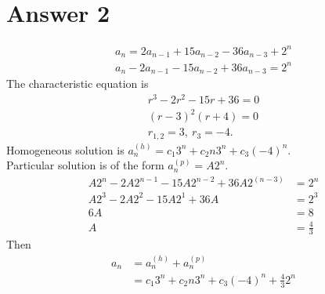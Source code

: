 \documentclass[11pt]{article}
\begin{document}
\section*{Answer 2}
\begin{align*}
    a_n = 2 a_{n-1} + 15 a_{n-2} - 36 a_{n-3} + 2^n \\
    a_n - 2 a_{n-1} - 15 a_{n-2} + 36 a_{n-3} = 2^n
\end{align*}
The characteristic equation is
\begin{align*}
    r^3 - 2r^2 - 15r + 36 = 0 \\
    (r - 3)^2 (r + 4) = 0 \\
    r_{1,2} = 3, \ r_3 = -4.
\end{align*}
Homogeneous solution is $a_n^{(h)} = c_1 3^n + c_2 n 3^n + c_3 (-4)^n$. \\
Particular solution is of the form $a_n^{(p)} = A 2^n$.
\begin{align*}
    A 2^n - 2 A 2^{n - 1} - 15 A 2^{n - 2} + 36 A 2^{(n - 3)} &= 2^n \\
    A 2^3 - 2 A 2^2 - 15 A 2^1 + 36 A &= 2^3 \\
    6A &= 8 \\
    A &= \frac{4}{3}
\end{align*}
Then
\begin{align*}
    a_n &= a_n^{(h)} + a_n^{(p)} \\
    &= c_1 3^n + c_2 n 3^n + c_3 (-4)^n + \frac{4}{3} 2^n
\end{align*}
\end{document}
